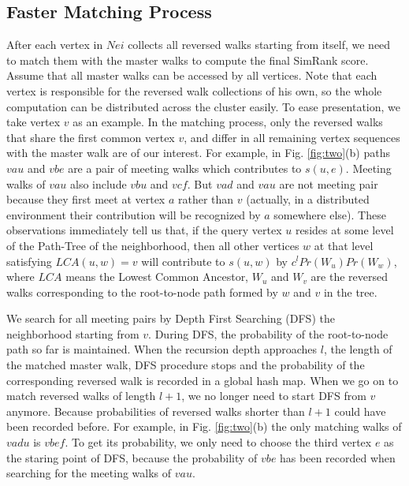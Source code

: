 \documentclass[conference]{IEEEtran}
\theoremstyle{definition}
\theoremstyle{definition}
\begin{document}
\subsection {Faster Matching Process}
After each vertex in $Nei$ collects all reversed walks starting from itself, we need to match them with the master walks to compute the final SimRank score.
Assume that all master walks can be accessed by all vertices.
Note that each vertex is responsible for the reversed walk collections of his own, so the whole computation can be  distributed across the cluster easily.
To ease presentation, we take vertex $v$ as an example.
In the matching process, only the reversed walks that share the first common vertex $v$, and differ in all remaining vertex sequences with the master walk are of our interest.
For example,  in Fig. \ref{fig:two}(b) paths $vau$ and $vbe$ are  a pair of meeting walks which contributes to $s(u, e)$. 
Meeting walks of $vau$ also include  $vbu$ and $vcf$.
But $vad$ and $vau$ are not meeting pair because they first meet at vertex $a$ rather than $v$ (actually,  in a distributed environment their contribution will be recognized by $a$ somewhere else).
These observations immediately tell us that,  if the query vertex $u$ resides at some level of the Path-Tree of the neighborhood, then all other vertices $w$ at that level satisfying $LCA(u, w)=v$ will contribute to $s(u,w)$ by  $c^{l}Pr(W_u)Pr(W_w)$, where $LCA$ means the Lowest Common Ancestor,  $W_u$ and $W_v$ are the reversed walks corresponding  to the root-to-node path formed by $w$ and $v$ in the tree.

We search for all  meeting pairs by  Depth First Searching (DFS) the neighborhood starting from $v$. 
During DFS,  the probability  of the root-to-node path so far is maintained. 
When the recursion depth approaches $l$, the length of the matched master walk,  DFS procedure stops and  the probability of the corresponding reversed walk is recorded in a global hash map.
When we go on to match reversed walks of length $l+1$,  we no longer need to start DFS from $v$ anymore. 
Because probabilities of  reversed walks shorter than $l+1$ could have been recorded before.
For example, in  Fig. \ref{fig:two}(b) the only matching walks of $vadu$  is $vbef$. 
To get its probability, we only need to choose the third vertex $e$ as the staring point of DFS, because the probability of $vbe$ has been recorded when searching for the meeting walks of  $vau$. 
\end{document}
